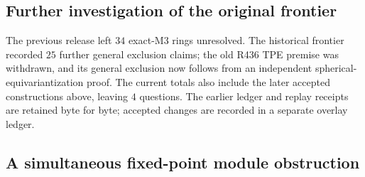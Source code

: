 \subsection{Further investigation of the original frontier}
The previous release left $34$ exact-M3 rings unresolved. The historical frontier recorded $25$ further general exclusion claims; the old R436 TPE premise was withdrawn, and its general exclusion now follows from an independent spherical-equivariantization proof. The current totals also include the later accepted constructions above, leaving $4$ questions. The earlier ledger and replay receipts are retained byte for byte; accepted changes are recorded in a separate overlay ledger.
\subsection{A simultaneous fixed-point module obstruction}
\label{subsec:simultaneous-fixed-point}

